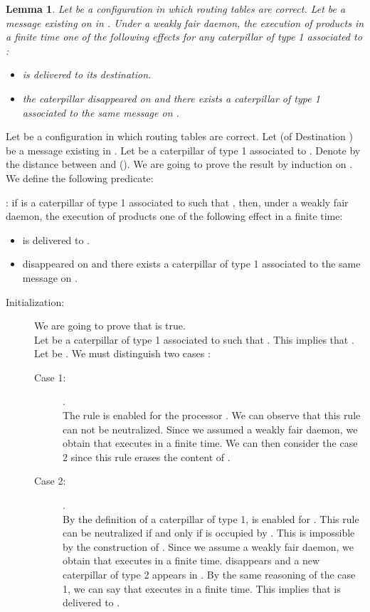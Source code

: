 \documentclass[11pt]{article}
\newtheorem{lemma}{Lemma}
\newenvironment{proof}{{\noindent\bf Proof. } }{{\hfill }}
\begin{document}
\begin{lemma} \label{lem:avanceN}
Let  be a configuration in which routing tables are correct. Let  be a message existing on  in . Under a weakly fair daemon, the execution of \AN products in a finite time one of the following effects for any caterpillar of type 1 associated to :
\begin{itemize}
\item  is delivered to its destination.
\item the caterpillar disappeared on  and there exists a caterpillar of type 1 associated to the same message on . 
\end{itemize}
\end{lemma}

\begin{proof}
Let  be a configuration in which routing tables are correct. Let  (of Destination ) be a message existing in . Let  be a caterpillar of type 1 associated to . Denote by  the distance between  and  (). We are going to prove the result by induction on . We define the following predicate:

: if  is a caterpillar of type 1 associated to  such that , then, under a weakly fair daemon, the execution of \AN products one of the following effect in a finite time:

\begin{itemize}
\item  is delivered to . 
\item  disappeared on  and there exists a caterpillar of type 1 associated to the same message on . 
\end{itemize}

\begin{description}
\item [Initialization:] We are going to prove that  is true.\\
Let  be a caterpillar of type 1 associated to  such that . This implies that . Let be . We must distinguish two cases :

\begin{description}
\item [Case 1:] .\\
The rule  is enabled for the processor . We can observe that this rule can not be neutralized. Since we assumed a weakly fair daemon, we obtain that  executes  in a finite time. We can then consider the case 2 since this rule erases the content of .
\item [Case 2:] .\\
By the definition of a caterpillar of type 1,  is enabled for . This rule can be neutralized if and only if  is occupied by . This is impossible by the construction of . Since we assume a weakly fair daemon, we obtain that  executes  in a finite time.  disappears and a new caterpillar of type 2 appears in . By the same reasoning of the case 1, we can say that  executes  in a finite time. This implies that  is delivered to .
\end{description}


\end{description}
\end{proof}
\end{document}
